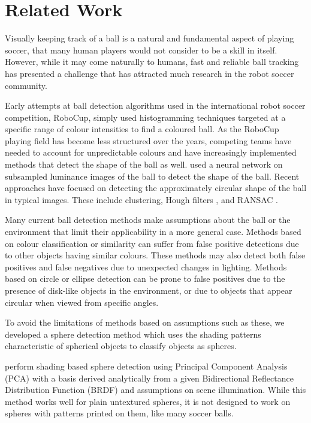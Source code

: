 \documentclass{llncs}
\begin{document}
	\section{Related Work} {
	\label{sec:related_work}

		Visually keeping track of a ball is a natural and fundamental aspect of playing soccer, that many human players would not consider to be a skill in itself. However, while it may come naturally to humans, fast and reliable ball tracking has presented a challenge that has attracted much research in the robot soccer community.

		Early attempts at ball detection algorithms used in the international robot soccer competition, RoboCup, simply used histogramming techniques targeted at a specific range of colour intensities to find a coloured ball. As the RoboCup playing field has become less structured over the years, competing teams have needed to account for unpredictable colours and have increasingly implemented methods that detect the shape of the ball as well. \citet{schulz2007ball} used a neural network on subsampled luminance images of the ball to detect the shape of the ball. Recent approaches have focused on detecting the approximately circular shape of the ball in typical images. These include clustering, Hough filters \citep{li2013survey}, and RANSAC \citep{annable2013nubots}.

		Many current ball detection methods make assumptions about the ball or the environment that limit their applicability in a more general case. Methods based on colour classification or similarity can suffer from false positive detections due to other objects having similar colours. These methods may also detect both false positives and false negatives due to unexpected changes in lighting. Methods based on circle or ellipse detection can be prone to false positives due to the presence of disk-like objects in the environment, or due to objects that appear circular when viewed from specific angles.

		To avoid the limitations of methods based on assumptions such as these, we developed a sphere detection method which uses the shading patterns characteristic of spherical objects to classify objects as spheres.

		\citet{nillius2008shading} perform shading based sphere detection using Principal Component Analysis (PCA) with a basis derived analytically from a given Bidirectional Reflectance Distribution Function (BRDF) and assumptions on scene illumination. While this method works well for plain untextured spheres, it is
		not designed to work on spheres with patterns printed on them, like many soccer balls.

}
\end{document}
